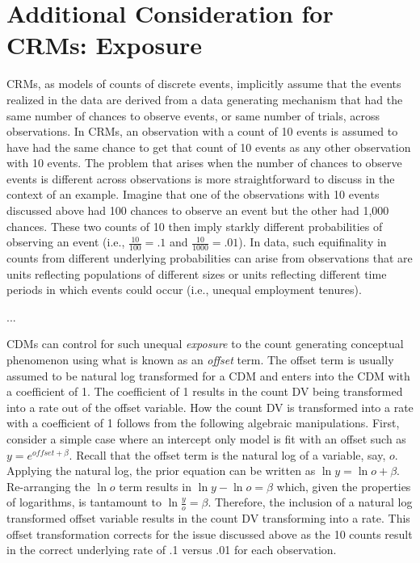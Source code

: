 \documentclass[ShortAfour,times,sageapa]{sagej}
\begin{document}
	
\section{Additional Consideration for CRMs: Exposure}
	
	CRMs, as models of counts of discrete events, implicitly assume that the events realized in the data are derived from a data generating mechanism that had the same number of chances to observe events, or same number of trials, across observations.
	In CRMs, an observation with a count of 10 events is assumed to have had the same chance to get that count of 10 events as any other observation with 10 events.  
	The problem that arises when the number of chances to observe events is different across observations is more straightforward to discuss in the context of an example.
	Imagine that one of the observations with 10 events discussed above had 100 chances to observe an event but the other had 1,000 chances.
	These two counts of 10 then imply starkly different probabilities of observing an event (i.e., $\frac{10}{100} = .1$ and $\frac{10}{1000} = .01$).
	In data, such equifinality in counts from different underlying probabilities can arise from observations that are units reflecting populations of different sizes or units reflecting different time periods in which events could occur (i.e., unequal employment tenures).
	
	...
	
	CDMs can control for such unequal \emph{exposure} to the count generating conceptual phenomenon using what is known as an \emph{offset} term.  
	The offset term is usually assumed to be natural log transformed for a CDM and enters into the CDM with a coefficient of 1.
	The coefficient of 1 results in the count DV being transformed into a rate out of the offset variable.
	How the count DV is transformed into a rate with a coefficient of 1 follows from the following algebraic manipulations.
	First, consider a simple case where an intercept only model is fit with an offset such as $y = e^{offset + \beta}$.
	Recall that the offset term is the natural log of a variable, say, $o$.  
	Applying the natural log, the prior equation can be written as $\ln y = \ln o + \beta$.
	Re-arranging the $\ln o$ term results in $\ln y - \ln o = \beta$ which, given the properties of logarithms, is tantamount to $\ln \frac{y}{o} = \beta$.
	Therefore, the inclusion of a natural log transformed offset variable results in the count DV transforming into a rate.
	This offset transformation corrects for the issue discussed above as the 10 counts result in the correct underlying rate of .1 versus .01 for each observation.
	
\end{document}
